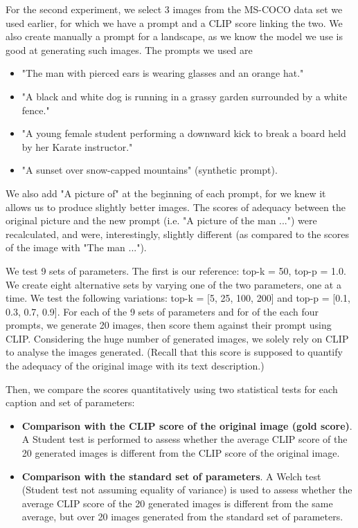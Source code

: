 \documentclass{article}
\begin{document}
\begin{multicols}{2}
For the second experiment, we select 3 images from the MS-COCO data set we used earlier, for which we have a prompt and a CLIP score linking the two. We also create manually a prompt for a landscape, as we know the model we use is good at generating such images. The prompts we used are
\begin{itemize}
    \item "The man with pierced ears is wearing glasses and an orange hat."
    \item "A black and white dog is running in a grassy garden surrounded by a white fence."
    \item "A young female student performing a downward kick to break a board held by her Karate instructor."
    \item "A sunset over snow-capped mountains" (synthetic prompt).
\end{itemize}
We also add "A picture of" at the beginning of each prompt, for we knew it allows us to produce slightly better images. The scores of adequacy between the original picture and the new prompt (i.e. "A picture of the man ...") were recalculated, and were, interestingly, slightly different (as compared to the scores of the image with "The man ..."). 

We test 9 sets of parameters. The first is our reference: top-k = 50, top-p = 1.0. We create eight alternative sets by varying one of the two parameters, one at a time. We test the following variations: top-k = [5, 25, 100, 200] and top-p = [0.1, 0.3, 0.7, 0.9]. For each of the 9 sets of parameters and for of the each four prompts, we generate 20 images, then score them against their prompt using CLIP. Considering the huge number of generated images, we solely rely on CLIP to analyse the images generated. (Recall that this score is supposed to quantify the adequacy of the original image with its text description.)

Then, we compare the scores quantitatively using two statistical tests for each caption and set of parameters:
\begin{itemize}
    \item \textbf{Comparison with the CLIP score of the original image (gold score)}. A Student test is performed to assess whether the average CLIP score of the 20 generated images is different from the CLIP score of the original image.
    \item \textbf{Comparison with the standard set of parameters}. A Welch test (Student test not assuming equality of variance) is used to assess whether the average CLIP score of the 20 generated images is different from the same average, but over 20 images generated from the standard set of parameters.
\end{itemize}


\end{multicols}
\end{document}
